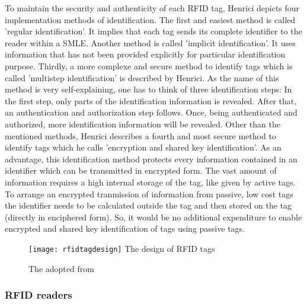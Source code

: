 To maintain the security and authenticity of each RFID tag, Henrici \cite[p.93 ff.]{henrici} depicts four implementation methods of identification. 
The first and easiest method is called 'regular identification'. It implies that each tag sends its complete identifier to the reader within a \ac{SMLE}. Another method is called 'implicit identification'. It uses information that has not been provided explicitly for particular identification purpose. Thirdly, a more complexe and secure method to identify tags which is called 'multistep identification' is described by Henrici. As the name of this method is very self-explaining, one has to think of three identification steps: In the first step, only parts of the identification information is revealed. After that, an authentication and authorization step follows. Once, being authenticated and authorized, more identification information will be revealed. 
Other than the mentioned methods, Henrici describes a fourth and most secure method to identify tags which he calls 'encryption and shared key identification'. As an advantage, this identification method protects every information contained in an identifier which can be transmitted in encrypted form. The vast amount of information requires a high internal storage of the tag, like given by active tags. To arrange an encrypted tranmission of information from passive, low cost tags the identifier needs to be calculated outside the tag and then stored on the tag (directly in enciphered form). So, it would be no additional expenditure to enable encrypted and shared key identification of tags using passive tags. 

\begin{figure}
\centering
\texttt{[image: rfidtagdesign]} The design of RFID tags 
\caption{\label{fig:tagdesign}The adopted from \cite[p.13]{chipless}} 
\end{figure}

\subsubsection{RFID readers} \label{reader}

